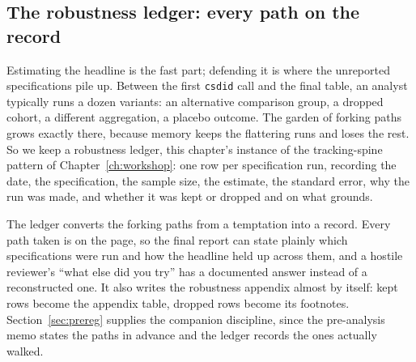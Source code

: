 \subsection{The robustness ledger: every path on the record}\label{ch08-sc-ledger}
Estimating the headline is the fast part; defending it is where the unreported specifications pile up. Between the first \texttt{csdid} call and the final table, an analyst typically runs a dozen variants: an alternative comparison group, a dropped cohort, a different aggregation, a placebo outcome. The garden of forking paths grows exactly there, because memory keeps the flattering runs and loses the rest. So we keep a robustness ledger, this chapter's instance of the tracking-spine pattern of Chapter~\ref{ch:workshop}: one row per specification run, recording the date, the specification, the sample size, the estimate, the standard error, why the run was made, and whether it was kept or dropped and on what grounds.

The ledger converts the forking paths from a temptation into a record. Every path taken is on the page, so the final report can state plainly which specifications were run and how the headline held up across them, and a hostile reviewer's \enquote{what else did you try} has a documented answer instead of a reconstructed one. It also writes the robustness appendix almost by itself: kept rows become the appendix table, dropped rows become its footnotes. Section~\ref{sec:prereg} supplies the companion discipline, since the pre-analysis memo states the paths in advance and the ledger records the ones actually walked.

